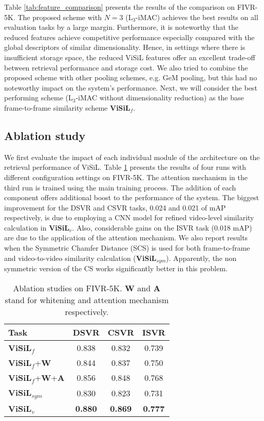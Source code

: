 \documentclass[10pt,twocolumn,letterpaper]{article}
\begin{document}
Table \ref{tab:feature_comparison} presents the results of the comparison on FIVR-5K.  The proposed scheme with $N=3$ (L$_3$-iMAC) achieves the best results on all evaluation tasks by a large margin. Furthermore, it is noteworthy that the reduced features achieve competitive performance especially compared with the global descriptors of similar dimensionality. Hence, in settings where there is insufficient storage space, the reduced ViSiL features offer an excellent trade-off between retrieval performance and storage cost.
We also tried to combine the proposed scheme with other pooling schemes, e.g. GeM pooling, but this had no noteworthy impact on the system's performance. Next, we will consider the best performing scheme (L$_3$-iMAC without dimensionality reduction) as the base frame-to-frame similarity scheme \textbf{ViSiL}$_f$.

\subsection{Ablation study}
\label{sec:ablation_study}

 We first evaluate the impact of each individual module of the architecture on the retrieval performance of ViSiL. Table \ref{tab:component_impact} presents the results of four runs with different configuration settings on FIVR-5K. The attention mechanism in the third run is trained using the main training process. The addition of each component offers additional boost to the performance of the system. The biggest improvement for the DSVR and CSVR tasks, 0.024 and 0.021 of mAP respectively, is due to employing a CNN model for refined video-level similarity calculation in \textbf{ViSiL}$_v$. Also, considerable gains on the ISVR task (0.018 mAP) are due to the application of the attention mechanism.
We also report results when the Symmetric Chamfer Distance (SCS) is used for both frame-to-frame and video-to-video similarity calculation (\textbf{ViSiL}$_{sym}$). Apparently, the non symmetric version of the CS works significantly better in this problem.

\begin{table}[h]
  \centering
  \begin{tabular}{|l|c|c|c|}
    \hline
      \textbf{Task}   &   \textbf{DSVR}   &   \textbf{CSVR}   &   \textbf{ISVR}   \\ \hline\hline
      \textbf{ViSiL}$_f$  &  0.838   &  0.832   &  0.739  \\ \hline
      \textbf{ViSiL}$_f$+\textbf{W}   &  0.844   &  0.837   &  0.750  \\ \hline
      \textbf{ViSiL}$_f$+\textbf{W}+\textbf{A} &  0.856   &  0.848   &  0.768 \\ \hline\hline
      \textbf{ViSiL}$_{sym}$ & 0.830   &  0.823   &  0.731  \\ \hline
      \textbf{ViSiL}$_v$  & \textbf{0.880}  &  \textbf{0.869}  &  \textbf{0.777}      \\ \hline
    \end{tabular}
  \caption{Ablation studies on FIVR-5K. \textbf{W} and \textbf{A} stand for whitening and attention mechanism respectively.}
  \label{tab:component_impact}
\end{table}
\end{document}
